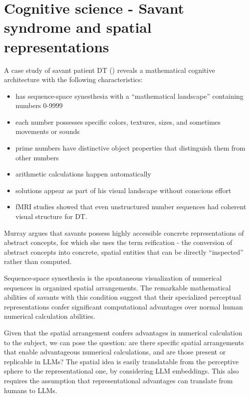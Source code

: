 \documentclass[
  a4paper, twoside, 10pt, titlepage]{book}
\providecommand{\tightlist}{%
  \setlength{\itemsep}{0pt}\setlength{\parskip}{0pt}}
\begin{document}
\section{Cognitive science - Savant syndrome and spatial
representations}\label{cognitive-science---savant-syndrome-and-spatial-representations}

A case study of savant patient DT () reveals a mathematical cognitive architecture with the following
characteristics:

\begin{itemize}
\tightlist
\item
  has sequence-space synesthesia with a ``mathematical landscape''
  containing numbers 0-9999
\item
  each number possesses specific colors, textures, sizes, and sometimes
  movements or sounds
\item
  prime numbers have distinctive object properties that distinguish them
  from other numbers
\item
  arithmetic calculations happen automatically
\item
  solutions appear as part of his visual landscape without conscious
  effort
\item
  fMRI studies showed that even unstructured number sequences had
  coherent visual structure for DT.
\end{itemize}

Murray argues that savants possess highly accessible concrete
representations of abstract concepts, for which she uses the term
reification - the conversion of abstract concepts into concrete, spatial
entities that can be directly ``inspected'' rather than computed.

Sequence-space synesthesia is the spontaneous visualization of numerical
sequences in organized spatial arrangements. The remarkable mathematical
abilities of savants with this condition suggest that their specialized
perceptual representations confer significant computational advantages
over normal human numerical calculation abilities.

Given that the spatial arrangement confers advantages in numerical
calculation to the subject, we can pose the question: are there specific
spatial arrangements that enable advantageous numerical calculations,
and are those present or replicable in LLMs? The spatial idea is easily
translatable from the perceptive sphere to the representational one, by
considering LLM embeddings. This also requires the assumption that
representational advantages can translate from humans to LLMs.
\end{document}
